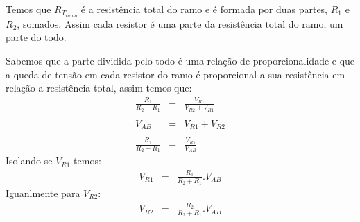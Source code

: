 Temos que $R_{T_{ramo}}$ é a resistência total do ramo e é formada por duas partes, $R_1$ e $R_2$, somados. Assim cada resistor é uma parte da resistência total do ramo, um parte do todo.

Sabemos que a parte dividida pelo todo é uma relação de proporcionalidade e que a queda de tensão em cada resistor do ramo é proporcional a sua resistência em relação a resistência total, assim temos que:
\begin{eqnarray}
\frac{R_1}{R_2+R_1} & = & \frac{V_{R1}}{V_{R2}+V_{R1}}\\
\nonumber\\
V_{AB} & = & V_{R1} + V_{R2} \\
\nonumber\\
\frac{R_1}{R_2+R_1} & = & \frac{V_{R1}}{V_{AB}}
\end{eqnarray}
Isolando-se $V_{R1}$  temos:
\begin{eqnarray}
V_{R1} & = & \frac{R_1}{R_2 + R_1} . V_{AB}
\end{eqnarray}
Iguanlmente para $V_{R2}$:
\begin{eqnarray}
V_{R2} & = & \frac{R_2}{R_2 + R_1} . V_{AB}
\end{eqnarray}
